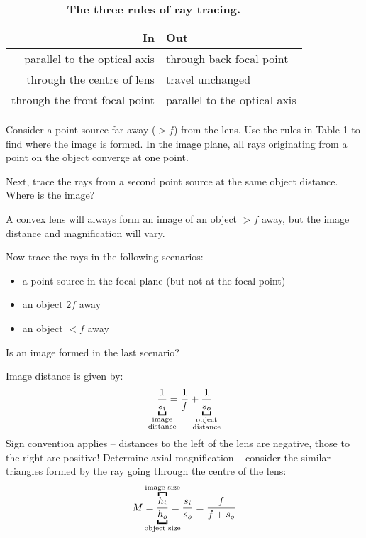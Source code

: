 \documentclass[a4paper]{report}
\newcommand{\nexercise}[0]{\arabic{exercises}\addtocounter{exercises}{1}}
\begin{document}
\begin{table}[!b]
\centering
\begin{tabularx}{0.7\textwidth}{r | l}
\toprule
\textbf{In} & \textbf{Out}
\\ \midrule
parallel to the optical axis & through back focal point \\
through the centre of lens & travel unchanged \\
through the front focal point & parallel to the optical axis \\
\bottomrule
\end{tabularx}
\label{tbl:rules}
\caption{
{\bf The three rules of ray tracing.}}
\end{table}

\begin{exercisebox}[frametitle={Exercise \nexercise: Image formation}]
Consider a point source far away ($>f$) from the lens. Use the rules in Table 1 to find where the image is formed. In the image plane, all rays originating from a point on the object converge at one point.

Next, trace the rays from a second point source at the same object distance. Where is the image?
\end{exercisebox}

A convex lens will always form an image of an object $>f$ away, but the image distance and magnification will vary.

\begin{exercisebox}[frametitle={Exercise \nexercise: Image formation}]
Now trace the rays in the following scenarios:
\begin{itemize}
	\item a point source in the focal plane (but not at the focal point)
	\item an object $2f$ away
	\item an object $<f$ away
\end{itemize}
Is an image formed in the last scenario?
\end{exercisebox}

Image distance is given by:
\begin{equation}
	\frac{1}{\underbracket{s_i}_{\mathclap{\substack{\text{image} \\ \text{distance}}}}} = 
	\frac{1}{f} + \frac{1}{\underbracket{s_o}_{\mathclap{\substack{\text{object} \\ \text{distance}}}}}
\end{equation}
Sign convention applies -- distances to the left of the lens are negative, those to the right are positive! Determine axial magnification -- consider the similar triangles formed by the ray going through the centre of the lens:
\begin{equation}
	M = \frac{\overbracket{h_i}^{\mathclap{\text{image size}}}}{\underbracket{h_o}_{\mathclap{\text{object size}}}} = \frac{s_i}{s_o} = \frac{f}{f + s_o}
\end{equation}
\end{document}
